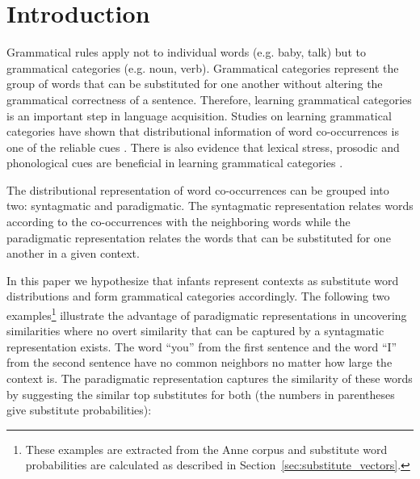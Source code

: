 \section{Introduction}
\label{sec:introduction}
Grammatical rules apply not to individual words (e.g. baby, talk) but to
grammatical categories (e.g. noun, verb).  Grammatical categories represent the
group of words that can be substituted for one another without altering the
grammatical correctness of a sentence.  Therefore, learning grammatical
categories is an important step in language acquisition.  Studies on
learning grammatical categories have shown that distributional
information of word co-occurrences is one of the reliable cues
\citep*{Mintz200391,clair2010,Redington98distributionalinformation}.  There is
also evidence that lexical stress, prosodic and phonological cues are
beneficial in learning grammatical categories
\citep*{monaghan2012integrating,saffran1996word,saffran1996word}. 

The distributional representation of word co-occurrences can be grouped into
two: syntagmatic and paradigmatic.  The syntagmatic representation relates
words according to the co-occurrences with the neighboring words while the
paradigmatic representation relates the words that can be substituted for one
another in a given context.

In this paper we hypothesize that infants represent contexts as substitute word
distributions and form grammatical categories accordingly.
The following two examples\footnote{These examples are extracted from the Anne
corpus and substitute word probabilities are calculated as described in
Section~\ref{sec:substitute_vectors}.} illustrate the advantage of paradigmatic
representations in uncovering similarities where no overt similarity that can
be captured by a syntagmatic representation exists. The word ``you'' from the
first sentence and the word ``I'' from the second sentence have no common
neighbors no matter how large the context is.  The paradigmatic representation
captures the similarity of these words by suggesting the similar top
substitutes for both (the numbers in parentheses give substitute
probabilities): 

